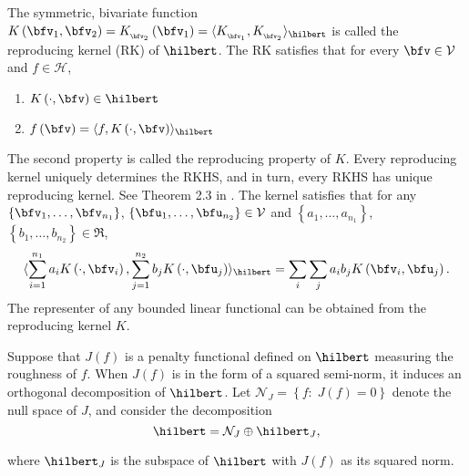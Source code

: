 \bigskip

The symmetric, bivariate function $K\left(\bfv_1, \bfv_2 \right) = K_{_{\bfv_2 }}\left(\bfv_1\right) = \langle K_{_{\bfv_1}}, K_{_{\bfv_2}} \rangle_\hilbert$ is called the reproducing kernel (RK) of $\hilbert$. The RK satisfies that for every $\bfv \in \mathcal{V}$ and $f \in \mathcal{H}$,

\begin{enumerate}
\item $K\left(\cdot, \bfv \right) \in \hilbert$ 
\item $f\left(\bfv\right) = \langle f, K\left(\cdot, \bfv\right)\rangle_\hilbert$\label{rkhs-reproducing-property}
\end{enumerate}
\noindent
The second property is called the reproducing property of $K$. Every reproducing kernel uniquely determines the RKHS, and in turn, every RKHS has unique reproducing kernel. See Theorem 2.3 in \cite{gu2013smoothing}. The kernel satisfies that for any $\left\{\bfv_1,\dots, \bfv_{n_1}\right\}$, $\left\{{\bfu}_1,\dots, {\bfu}_{n_2}\right\} \in \mathcal{V}$ and $\left\{a_1,\dots, a_{n_1}\right\}$, $\left\{b_1,\dots, b_{n_2}\right\} \in \Re$,
\begin{equation}
 \langle\sum_{i = 1}^{n_1} a_i K\left(\cdot, \bfv_i\right), \sum_{j = 1}^{n_2} b_j K\left(\cdot, {\bfu}_j\right) \rangle_\hilbert = \sum_i \sum_j a_ib_j K\left(\bfv_i ,\bfu_j\right).
\end{equation}
\noindent
The representer of any bounded linear functional can be obtained from the reproducing kernel $K$. 
\bigskip

Suppose that $J\left(f\right)$ is a penalty functional defined on $\hilbert$ measuring the roughness of $f$. When $J\left(f\right)$ is in the form of a squared semi-norm, it induces an orthogonal decomposition of $\hilbert$. Let $\mathcal{N}_J = \left\{ f:\; J\left(f\right) = 0\right\}$ denote the null space of $J$, and consider the decomposition
\[
\hilbert = \mathcal{N}_J \oplus \hilbert_J,
\]

\noindent
where $\hilbert_J$ is the subspace of $\hilbert$ with $J\left(f\right)$ as its squared norm. 

